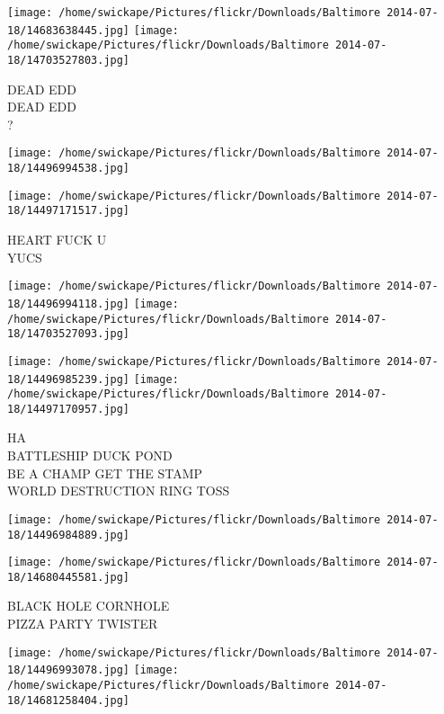 \documentclass[10pt,letterpaper]{article}
\begin{document}
\vspace{0.25in}
\texttt{[image: /home/swickape/Pictures/flickr/Downloads/Baltimore 2014-07-18/14683638445.jpg]}
\texttt{[image: /home/swickape/Pictures/flickr/Downloads/Baltimore 2014-07-18/14703527803.jpg]}

DEAD EDD\\
DEAD EDD\\
?\\
\pagebreak

\texttt{[image: /home/swickape/Pictures/flickr/Downloads/Baltimore 2014-07-18/14496994538.jpg]}

\vspace{0.25in}
\texttt{[image: /home/swickape/Pictures/flickr/Downloads/Baltimore 2014-07-18/14497171517.jpg]}

HEART FUCK U\\
YUCS\\
\pagebreak

\texttt{[image: /home/swickape/Pictures/flickr/Downloads/Baltimore 2014-07-18/14496994118.jpg]}
\texttt{[image: /home/swickape/Pictures/flickr/Downloads/Baltimore 2014-07-18/14703527093.jpg]}

\texttt{[image: /home/swickape/Pictures/flickr/Downloads/Baltimore 2014-07-18/14496985239.jpg]}
\texttt{[image: /home/swickape/Pictures/flickr/Downloads/Baltimore 2014-07-18/14497170957.jpg]}

HA\\
BATTLESHIP DUCK POND\\
BE A CHAMP GET THE STAMP\\
WORLD DESTRUCTION RING TOSS\\
\pagebreak

\texttt{[image: /home/swickape/Pictures/flickr/Downloads/Baltimore 2014-07-18/14496984889.jpg]}

\vspace{0.25in}
\texttt{[image: /home/swickape/Pictures/flickr/Downloads/Baltimore 2014-07-18/14680445581.jpg]}

BLACK HOLE CORNHOLE\\
PIZZA PARTY TWISTER\\
\pagebreak

\texttt{[image: /home/swickape/Pictures/flickr/Downloads/Baltimore 2014-07-18/14496993078.jpg]}
\texttt{[image: /home/swickape/Pictures/flickr/Downloads/Baltimore 2014-07-18/14681258404.jpg]}
\end{document}
